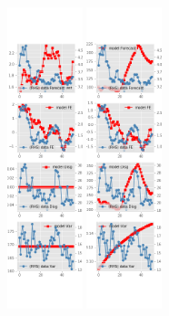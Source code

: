 \documentclass[]{article}
\begin{document}
\begin{figure}[ht]
\begin{subfigure}[b]{\textwidth}
		\includegraphics[width=0.24\textwidth]{figures/sce_se_est_diag2.png}
		\includegraphics[width=0.24\textwidth]{figures/sce_se_est_diag3.png}
	\end{subfigure}
	\vspace{1em}
	\vfill
	\begin{subfigure}[b]{\textwidth}

\end{subfigure}
\end{figure}
\end{document}
